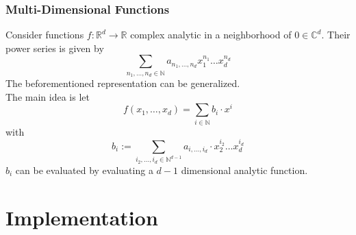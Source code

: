 \documentclass[xcolor=pdftex,dvipsnames,table]{beamer}
\newcommand{\N}{\ensuremath{\mathbb{N}}}
\newcommand{\RR}{\ensuremath{\mathbb{R}}}
\newcommand{\C}{\ensuremath{\mathbb{C}}}
\newcommand{\abs}[1]{\left|#1\right|}
\begin{document}
\begin{frame}
  \frametitle{Multi-Dimensional Functions}
  Consider functions $f: \RR^d \to \RR$ complex analytic in a neighborhood of $0 \in \C^d$.
  \pause
  Their power series is given by
  $$\sum_{n_1, \dots, n_d \in \N} a_{n_1,\dots,n_d}x_1^{ n_1 } \dots x_d^{ n_d }$$
  \pause
  The beforementioned representation can be generalized.\\
  The main idea is let
  $$f(x_1, \dots, x_d) = \sum_{i \in \N} b_i\cdot x^i$$
  with
  $$b_{i} := \sum_{i_2, \dots, i_d \in \N^{d-1}} a_{i, \dots, i_d} \cdot x_2^{i_2} \dots x_d^{i_d}$$
  \pause
  $b_i$ can be evaluated by evaluating a $d-1$ dimensional analytic function.
  \end{frame}
\section{Implementation}
\end{document}
